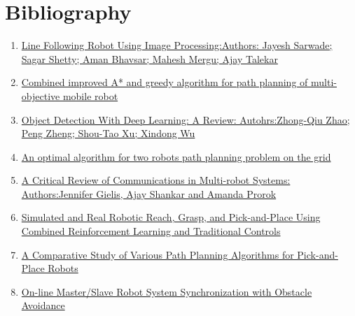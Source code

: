 \documentclass[a4paper,12pt,oneside]{book}
\begin{document}
\section{Bibliography}
\begin{enumerate}
  \item \href{https://ieeexplore.ieee.org/document/8819826}{Line Following Robot Using Image Processing:Authors: Jayesh Sarwade; Sagar Shetty; Aman Bhavsar; Mahesh Mergu; Ajay Talekar}

  \item \href{https://www.researchgate.net/publication/362429029_Combined_improved_A_and_greedy_algorithm_for_path_planning_of_multi-objective_mobile_robot}{Combined improved A* and greedy algorithm for path planning of multi-objective mobile robot }
  \item \href{https://ieeexplore.ieee.org/abstract/document/8627998}{Object Detection With Deep Learning: A Review: Autohrs:Zhong-Qiu Zhao; Peng Zheng; Shou-Tao Xu; Xindong Wu}

\item \href{https://www.sciencedirect.com/science/article/abs/pii/S0921889013001383}{An optimal algorithm for two robots path planning problem on the grid}
\item \href{https://link.springer.com/article/10.1007/s43154-022-00090-9}{A Critical Review of Communications in Multi-robot Systems: Authors:Jennifer Gielis, Ajay Shankar and Amanda Prorok }
\item \href{https://www.mdpi.com/2218-6581/12/1/12}{Simulated and Real Robotic Reach, Grasp, and Pick-and-Place Using Combined Reinforcement Learning and Traditional Controls}

\item \href{https://assets.researchsquare.com/files/rs-2808265/v1/14f78e64-4eb2-4e69-8910-adf0ed91661b.pdf?c=1684249343}{A Comparative Study of Various Path Planning
Algorithms for Pick-and-Place Robots
}
\item \href{https://www.semanticscholar.org/paper/On-line-Master-Slave-Robot-System-Synchronization-Portillo-V%C3%A9lez-Cruz-Villar/7b4696550ebe724eae0fa5be8e9cda7ace33da01}{On-line Master/Slave Robot System Synchronization with Obstacle Avoidance}
\end{enumerate}
\end{document}
